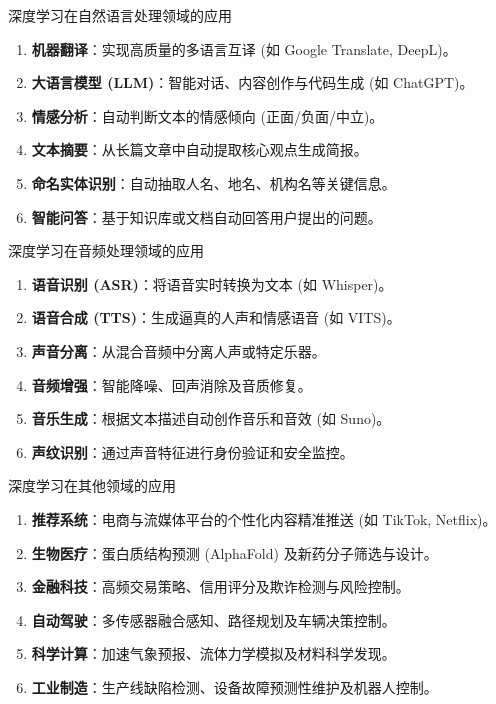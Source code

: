 \documentclass[12pt, t, aspectratio=169]{beamer}
\begin{document}
\begin{frame}{深度学习在自然语言处理领域的应用}
    \begin{enumerate}
        \item \textbf{机器翻译}：实现高质量的多语言互译 (如 Google Translate, DeepL)。
        \item \textbf{大语言模型 (LLM)}：智能对话、内容创作与代码生成 (如 ChatGPT)。
        \item \textbf{情感分析}：自动判断文本的情感倾向 (正面/负面/中立)。
        \item \textbf{文本摘要}：从长篇文章中自动提取核心观点生成简报。
        \item \textbf{命名实体识别}：自动抽取人名、地名、机构名等关键信息。
        \item \textbf{智能问答}：基于知识库或文档自动回答用户提出的问题。
    \end{enumerate}
\end{frame}

\begin{frame}{深度学习在音频处理领域的应用}
    \begin{enumerate}
        \item \textbf{语音识别 (ASR)}：将语音实时转换为文本 (如 Whisper)。
        \item \textbf{语音合成 (TTS)}：生成逼真的人声和情感语音 (如 VITS)。
        \item \textbf{声音分离}：从混合音频中分离人声或特定乐器。
        \item \textbf{音频增强}：智能降噪、回声消除及音质修复。
        \item \textbf{音乐生成}：根据文本描述自动创作音乐和音效 (如 Suno)。
        \item \textbf{声纹识别}：通过声音特征进行身份验证和安全监控。
    \end{enumerate}
\end{frame}

\begin{frame}{深度学习在其他领域的应用}
    \begin{enumerate}
        \item \textbf{推荐系统}：电商与流媒体平台的个性化内容精准推送 (如 TikTok, Netflix)。
        \item \textbf{生物医疗}：蛋白质结构预测 (AlphaFold) 及新药分子筛选与设计。
        \item \textbf{金融科技}：高频交易策略、信用评分及欺诈检测与风险控制。
        \item \textbf{自动驾驶}：多传感器融合感知、路径规划及车辆决策控制。
        \item \textbf{科学计算}：加速气象预报、流体力学模拟及材料科学发现。
        \item \textbf{工业制造}：生产线缺陷检测、设备故障预测性维护及机器人控制。
    \end{enumerate}
\end{frame}
\end{document}
